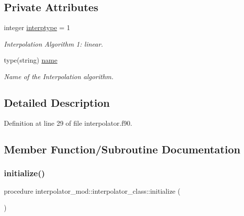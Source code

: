\subsection*{Private Attributes}
\begin{DoxyCompactItemize}
\item 
integer \mbox{\hyperlink{structinterpolator__mod_1_1interpolator__class_afdfac8b305fd660e113fcc4b2145a8da}{interptype}} = 1
\begin{DoxyCompactList}\small\item\em Interpolation Algorithm 1\+: linear. \end{DoxyCompactList}\item 
type(string) \mbox{\hyperlink{structinterpolator__mod_1_1interpolator__class_ac0d7be3d07fb72dec420461e031d6983}{name}}
\begin{DoxyCompactList}\small\item\em Name of the Interpolation algorithm. \end{DoxyCompactList}\end{DoxyCompactItemize}


\subsection{Detailed Description}


Definition at line 29 of file interpolator.\+f90.



\subsection{Member Function/\+Subroutine Documentation}
\mbox{\label{structinterpolator__mod_1_1interpolator__class_a6911f5a4e2cbe3fcd8fbfce906429436}} 
\subsubsection{\texorpdfstring{initialize()}{initialize()}}
{\footnotesize\ttfamily procedure interpolator\+\_\+mod\+::interpolator\+\_\+class\+::initialize (\begin{DoxyParamCaption}{ }\end{DoxyParamCaption})\hspace{0.3cm}{\ttfamily [private]}}



